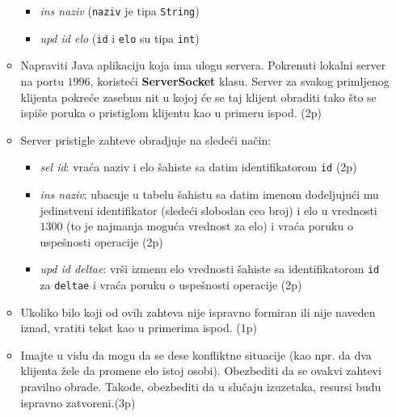 \documentclass[]{article}
\begin{document}
\begin{enumerate}
\begin{itemize}
\begin{itemize}
      \item \textit{ins naziv} (\texttt{naziv} je tipa \texttt{String}) 
      \item \textit{upd id elo} (\texttt{id} i \texttt{elo} su tipa \texttt{int})
  \end{itemize}
  \item Napraviti Java aplikaciju koja ima ulogu servera. Pokrenuti lokalni server na portu $1996$, koristeći \textbf{ServerSocket} klasu. Server za svakog primljenog klijenta pokreće zasebnu nit u kojoj \'c{}e se taj klijent obraditi tako \v{s}to se ispi\v{s}e poruka o pristiglom klijentu kao u primeru ispod. \hfill (2p)
  \item Server pristigle zahteve obradjuje na slede\'c{}i na\v{c}in:
  \begin{itemize}
    \item \textit{sel id}: vra\'c{}a naziv i elo \v{s}ahiste sa datim identifikatorom \texttt{id} \hfill (2p)
    \item \textit{ins naziv}: ubacuje u tabelu \v{s}ahistu sa datim imenom dodeljuju\'c{}i mu jedinstveni identifikator (slede\'c{}i slobodan ceo broj) i elo u vrednosti $1300$ (to je najmanja mogu\'c{}a vrednost za elo) i vra\'c{}a poruku o uspe\v{s}nosti operacije \hfill (2p)
    \item \textit{upd id deltae}: vr\v{s}i izmenu elo vrednosti \v{s}ahiste sa identifikatorom \texttt{id} za \texttt{deltae} i vra\'c{}a poruku o uspe\v{s}nosti operacije \hfill (2p)
  \end{itemize}
  \item Ukoliko bilo koji od ovih zahteva nije ispravno formiran ili nije naveden iznad, vratiti tekst kao u primerima ispod. \hfill(1p)
  \item Imajte u vidu da mogu da se dese konfliktne situacije (kao npr. da dva klijenta žele da promene elo istoj osobi). Obezbediti da se ovakvi zahtevi pravilno obrade. Takođe, obezbediti da u slučaju izuzetaka, resursi budu ispravno zatvoreni.\hfill (3p)
\end{itemize}


\end{enumerate}
\end{document}
